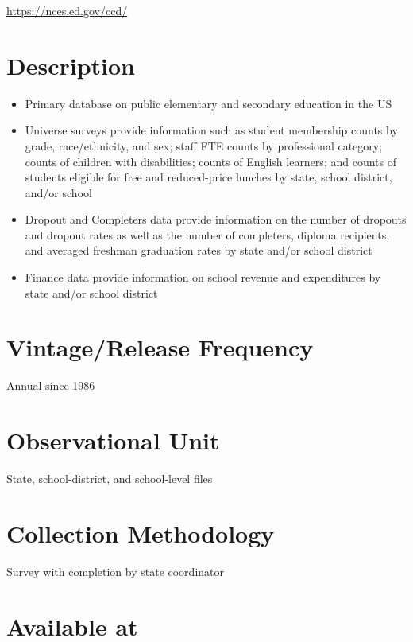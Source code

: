 \documentclass[
]{book}
\providecommand{\tightlist}{%
  \setlength{\itemsep}{0pt}\setlength{\parskip}{0pt}}
\begin{document}
\url{https://nces.ed.gov/ccd/}

\hypertarget{description-16}{%
\section{Description}\label{description-16}}

\begin{itemize}
\tightlist
\item
  Primary database on public elementary and secondary education in the US
\item
  Universe surveys provide information such as student membership counts by grade, race/ethnicity, and sex; staff FTE counts by professional category; counts of children with disabilities; counts of English learners; and counts of students eligible for free and reduced-price lunches by state, school district, and/or school
\item
  Dropout and Completers data provide information on the number of dropouts and dropout rates as well as the number of completers, diploma recipients, and averaged freshman graduation rates by state and/or school district
\item
  Finance data provide information on school revenue and expenditures by state and/or school district
\end{itemize}

\hypertarget{vintagerelease-frequency-16}{%
\section{Vintage/Release Frequency}\label{vintagerelease-frequency-16}}

Annual since 1986

\hypertarget{observational-unit-16}{%
\section{Observational Unit}\label{observational-unit-16}}

State, school-district, and school-level files

\hypertarget{collection-methodology-16}{%
\section{Collection Methodology}\label{collection-methodology-16}}

Survey with completion by state coordinator

\hypertarget{available-at-16}{%
\section{Available at}\label{available-at-16}}
\end{document}
